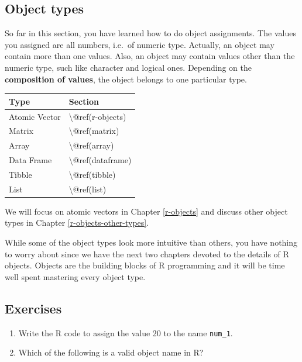 \documentclass[
]{book}
\begin{document}
\hypertarget{object-types}{%
\subsection{Object types}\label{object-types}}

So far in this section, you have learned how to do object assignments. The values you assigned are all numbers, i.e.~of numeric type. Actually, an object may contain more than one values. Also, an object may contain values other than the numeric type, such like character and logical ones. Depending on the \textbf{composition of values}, the object belongs to one particular type.

\begin{tabular}{l|l}
\hline
Type & Section\\
\hline
Atomic Vector & \textbackslash{}@ref(r-objects)\\
\hline
Matrix & \textbackslash{}@ref(matrix)\\
\hline
Array & \textbackslash{}@ref(array)\\
\hline
Data Frame & \textbackslash{}@ref(dataframe)\\
\hline
Tibble & \textbackslash{}@ref(tibble)\\
\hline
List & \textbackslash{}@ref(list)\\
\hline
\end{tabular}

We will focus on atomic vectors in Chapter \ref{r-objects} and discuss other object types in Chapter \ref{r-objects-other-types}.

While some of the object types look more intuitive than others, you have nothing to worry about since we have the next two chapters devoted to the details of R objects. Objects are the building blocks of R programming and it will be time well spent mastering every object type.

\hypertarget{exercises-2}{%
\subsection{Exercises}\label{exercises-2}}

\begin{enumerate}
\def\labelenumi{\arabic{enumi}.}
\item
  Write the R code to assign the value 20 to the name \texttt{num\_1}.
\item
  Which of the following is a valid object name in R?
\end{enumerate}
\end{document}
